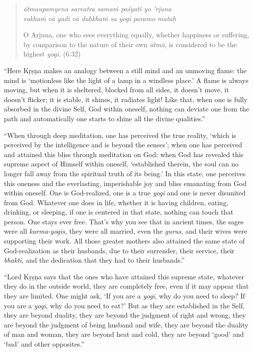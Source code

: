 \documentclass[12pt, twoside, openright]{memoir}
\begin{document}
\par
\begin{verse}
\textit{ātmaupamyena sarvatra samaṁ paśyati yo ’rjuna} \\
\textit{sukhaṁ vā yadi vā duḥkhaṁ sa yogī paramo mataḥ}

\noindent O Arjuna, one who sees everything equally, whether happiness or suffering, by comparison to the nature of their own \textit{ātmā}, is considered to be the highest \textit{yogī}. (6.32)
\end{verse}
\par


\enquote{Here Kṛṣṇa makes an analogy between a still mind and an unmoving flame: the mind is \enquote{motionless like the light of a lamp in a windless place.} A flame is always moving, but when it is sheltered, blocked from all sides, it doesn’t move, it doesn’t flicker; it is stable, it shines, it radiates light! Like that, when one is fully absorbed in the divine Self, God within oneself, nothing can deviate one from the path and automatically one starts to shine all the divine qualities.}

\enquote{When through deep meditation, one has perceived the true reality, \enquote{which is perceived by the intelligence and is beyond the senses}; when one has perceived and attained this bliss through meditation on God; when God has revealed this supreme aspect of Himself within oneself, \enquote{established therein, the soul can no longer fall away from the spiritual truth of its being.} In this state, one perceives this oneness and the everlasting, imperishable joy and bliss emanating from God within oneself. One is God-realized, one is a true \textit{yogī} and one is never disunited from God. Whatever one does in life, whether it is having children, eating, drinking, or sleeping, if one is centered in that state, nothing can touch that person. One stays ever free. That’s why you see that in ancient times, the sages were all \textit{karma-yogīs}, they were all married, even the \textit{gurus}, and their wives were supporting their work. All those greater mothers also attained the same state of God-realization as their husbands, due to their surrender, their service, their \textit{bhakti}, and the dedication that they had to their husbands.}

\enquote{Lord Kṛṣṇa says that the ones who have attained this supreme state, whatever they do in the outside world, they are completely free, even if it may appear that they are limited. One might ask, \enquote{If you are a \textit{yogī}, why do you need to sleep? If you are a \textit{yogī}, why do you need to eat?} But as they are established in the Self, they are beyond duality, they are beyond the judgment of right and wrong, they are beyond the judgment of being husband and wife, they are beyond the duality of man and woman, they are beyond heat and cold, they are beyond \enquote{good} and \enquote{bad} and other opposites.}
\end{document}
